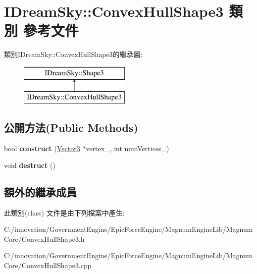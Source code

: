 \hypertarget{class_i_dream_sky_1_1_convex_hull_shape3}{}\section{I\+Dream\+Sky\+:\+:Convex\+Hull\+Shape3 類別 參考文件}
\label{class_i_dream_sky_1_1_convex_hull_shape3}
類別\+I\+Dream\+Sky\+:\+:Convex\+Hull\+Shape3的繼承圖\+:\begin{figure}[H]
\begin{center}
\leavevmode
\includegraphics[height=2.000000cm]{class_i_dream_sky_1_1_convex_hull_shape3}
\end{center}
\end{figure}
\subsection*{公開方法(Public Methods)}
\begin{DoxyCompactItemize}
\item 
bool {\bfseries construct} (\hyperlink{class_i_dream_sky_1_1_vector3}{Vector3} $\ast$vertex\+\_\+, int num\+Vertices\+\_\+)\hypertarget{class_i_dream_sky_1_1_convex_hull_shape3_aaecc70e571d683c3f08fffe43a99a873}{}\label{class_i_dream_sky_1_1_convex_hull_shape3_aaecc70e571d683c3f08fffe43a99a873}

\item 
void {\bfseries destruct} ()\hypertarget{class_i_dream_sky_1_1_convex_hull_shape3_afb7c859a2b04dbf78835855f86dcf59a}{}\label{class_i_dream_sky_1_1_convex_hull_shape3_afb7c859a2b04dbf78835855f86dcf59a}

\end{DoxyCompactItemize}
\subsection*{額外的繼承成員}


此類別(class) 文件是由下列檔案中產生\+:\begin{DoxyCompactItemize}
\item 
C\+:/innovation/\+Government\+Engine/\+Epic\+Force\+Engine/\+Magnum\+Engine\+Lib/\+Magnum\+Core/Convex\+Hull\+Shape3.\+h\item 
C\+:/innovation/\+Government\+Engine/\+Epic\+Force\+Engine/\+Magnum\+Engine\+Lib/\+Magnum\+Core/Convex\+Hull\+Shape3.\+cpp\end{DoxyCompactItemize}
